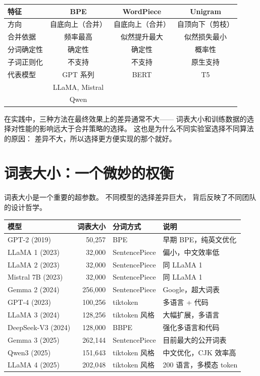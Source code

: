 \begin{center}
\small
\begin{tabular}{lccc}
\hline
\textbf{特征} & \textbf{BPE} & \textbf{WordPiece} & \textbf{Unigram} \\
\hline
方向           & 自底向上（合并） & 自底向上（合并） & 自顶向下（剪枝） \\
合并依据       & 频率最高       & 似然提升最大     & 似然损失最小     \\
分词确定性     & 确定性         & 确定性           & 概率性           \\
子词正则化     & 不支持         & 不支持           & 原生支持         \\
代表模型       & GPT 系列       & BERT             & T5               \\
               & LLaMA, Mistral &                  &                  \\
               & Qwen           &                  &                  \\
\hline
\end{tabular}
\end{center}

在实践中，三种方法在最终效果上的差异通常不大——
词表大小和训练数据的选择对性能的影响远大于合并策略的选择。
这也是为什么不同实验室选择不同算法的原因：
差异不大，所以选择更方便实现的那个就好。

\section{词表大小：一个微妙的权衡}

词表大小是一个重要的超参数。
不同模型的选择差异巨大，
背后反映了不同团队的设计哲学。

\begin{center}
\small
\begin{tabular}{lrll}
\hline
\textbf{模型} & \textbf{词表大小} & \textbf{分词方式} & \textbf{说明} \\
\hline
GPT-2 (2019)       & 50,257   & BPE          & 早期 BPE，纯英文优化 \\
LLaMA 1 (2023)     & 32,000   & SentencePiece & 偏小，中文效率低 \\
LLaMA 2 (2023)     & 32,000   & SentencePiece & 同 LLaMA 1 \\
Mistral 7B (2023)  & 32,000   & SentencePiece & 同 LLaMA 1 \\
Gemma 2 (2024)     & 256,000  & SentencePiece & Google，超大词表 \\
GPT-4 (2023)       & 100,256  & tiktoken      & 多语言 + 代码 \\
LLaMA 3 (2024)     & 128,256  & tiktoken 风格 & 大幅扩展，多语言 \\
DeepSeek-V3 (2024) & 128,000  & BBPE          & 强化多语言和代码 \\
Gemma 3 (2025)     & 262,144  & SentencePiece & 目前最大的公开词表 \\
Qwen3 (2025)       & 151,643  & tiktoken 风格 & 中文优化，CJK 效率高 \\
LLaMA 4 (2025)     & 202,048  & tiktoken 风格 & 200 语言，多模态 token \\
\hline
\end{tabular}
\end{center}

